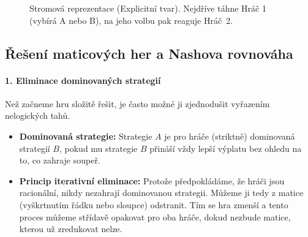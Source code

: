 \begin{figure}[htbp]
    \centering
    \caption{Stromová reprezentace (Explicitní tvar). Nejdříve táhne Hráč 1 (vybírá A nebo B), na jeho volbu pak reaguje Hráč~2.}
\end{figure}

\subsection{Řešení maticových her a Nashova rovnováha}

\paragraph*{1. Eliminace dominovaných strategií}
Než začneme hru složitě řešit, je často možné ji zjednodušit vyřazením nelogických tahů.
\begin{itemize}
    \item \textbf{Dominovaná strategie:} Strategie $A$ je pro hráče (striktně) dominovaná strategií $B$, pokud mu strategie $B$ přináší vždy lepší výplatu bez ohledu na to, co zahraje soupeř.
    \item \textbf{Princip iterativní eliminace:} Protože předpokládáme, že hráči jsou racionální, nikdy nezahrají dominovanou strategii. Můžeme ji tedy z matice (vyškrtnutím řádku nebo sloupce) odstranit. Tím se hra zmenší a tento proces můžeme střídavě opakovat pro oba hráče, dokud nezbude matice, kterou už zredukovat nelze.
\end{itemize}

